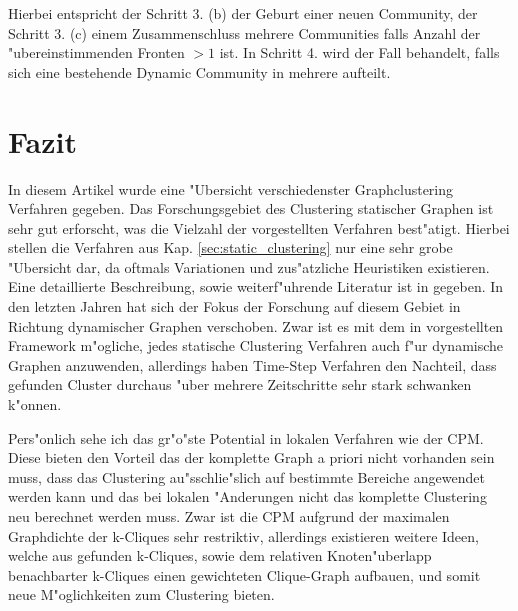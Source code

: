 \documentclass[journal]{vgtc}
\begin{document}
    Hierbei entspricht der Schritt 3. (b) der Geburt einer neuen Community, der Schritt 3. (c) einem Zusammenschluss mehrere Communities falls Anzahl der "ubereinstimmenden
    Fronten $>1$ ist. In Schritt 4. wird der Fall behandelt, falls sich eine bestehende Dynamic Community in mehrere aufteilt.

\section{Fazit}
  In diesem Artikel wurde eine "Ubersicht verschiedenster Graphclustering Verfahren gegeben. Das Forschungsgebiet des Clustering statischer Graphen ist sehr gut
  erforscht, was die Vielzahl der vorgestellten Verfahren best"atigt. Hierbei stellen die Verfahren aus Kap. \ref{sec:static_clustering} nur eine sehr grobe "Ubersicht
  dar, da oftmals Variationen und zus"atzliche Heuristiken existieren. Eine detaillierte Beschreibung, sowie weiterf"uhrende Literatur ist in \cite{Schaeffer} gegeben.
  In den letzten Jahren hat sich der Fokus der Forschung auf diesem Gebiet in Richtung dynamischer Graphen verschoben. Zwar ist es mit dem in \cite{timestep} vorgestellten
  Framework m"ogliche, jedes statische Clustering Verfahren auch f"ur dynamische Graphen anzuwenden, allerdings haben Time-Step Verfahren den Nachteil, dass gefunden Cluster
  durchaus "uber mehrere Zeitschritte sehr stark schwanken k"onnen.
  
  Pers"onlich sehe ich das gr"o"ste Potential in lokalen Verfahren wie der CPM. Diese bieten den Vorteil das der komplette Graph a priori nicht vorhanden sein muss, 
  dass das Clustering au"sschlie"slich auf bestimmte Bereiche angewendet werden kann und das bei lokalen "Anderungen nicht das komplette Clustering neu berechnet werden muss.
  Zwar ist die CPM aufgrund der maximalen Graphdichte der k-Cliques sehr restriktiv, allerdings existieren weitere Ideen, welche aus gefunden k-Cliques, sowie dem
  relativen Knoten"uberlapp benachbarter k-Cliques einen gewichteten Clique-Graph\cite{clique_graph} aufbauen, und somit neue M"oglichkeiten zum Clustering bieten.
    


\end{document}
